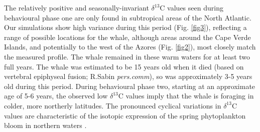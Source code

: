 \documentclass[a4paper,12pt]{article}
\begin{document}



 
The relatively positive and seasonally-invariant $\delta^{13}$C values seen during behavioural phase one are only found in subtropical areas of the North Atlantic.  
Our simulations show high variance during this period (Fig. \ref{fig3}), reflecting a range of possible locations for the whale, although areas around the Cape Verde Islands, and potentially to the west of the Azores (Fig. \ref{fig2}), most closely match the measured profile. 
The whale remained in these warm waters for at least two full years. 
The whale was estimated to be 15 years old when it died (based on vertebral epiphyseal fusion; R.Sabin \textit{pers.comm}), so was approximately 3-5 years old during this period.
During behavioural phase two, starting at an approximate age of 5-6 years, the observed low $\delta^{13}$C values imply that the whale is foraging in colder, more northerly latitudes. 
The pronounced cyclical variations in $\delta^{13}$C values are characteristic of the isotopic expression of the spring phytoplankton bloom in northern waters \cite{magozzi2017using}.  
\end{document}
